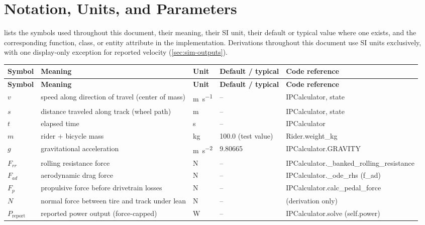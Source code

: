 \section{Notation, Units, and Parameters}
\label{sec:notation}

 lists the symbols used throughout this document, their
meaning, their SI unit, their default or typical value where one exists, and
the corresponding function, class, or entity attribute in the implementation.
Derivations
throughout this document use SI units exclusively, with one display-only
exception for reported velocity (\cref{sec:sim-outputs}).

{\scriptsize
\setlength{\tabcolsep}{4pt}
\begin{longtable}{@{}p{} p{} p{} p{} >{\ttfamily}p{}@{}}
    \toprule
    \textbf{Symbol} & \textbf{Meaning} & \textbf{Unit} & \textbf{Default / typical} & \textbf{Code reference} \\
    \midrule
    \endfirsthead
    \toprule
    \textbf{Symbol} & \textbf{Meaning} & \textbf{Unit} & \textbf{Default / typical} & \textbf{Code reference} \\
    \midrule
    \endhead
    $v$ & speed along direction of travel (center of mass) & \si{\metre\per\second} & -- & IPCalculator, state \\
    $s$ & distance traveled along track (wheel path) & \si{\metre} & -- & IPCalculator, state \\
    $t$ & elapsed time & \si{\second} & -- & IPCalculator \\
    $m$ & rider + bicycle mass & \si{\kilo\gram} & \num{100.0} (test value) & Rider.\allowbreak weight\_kg \\
    $g$ & gravitational acceleration & \si{\metre\per\second\squared} & \num{9.80665} & IPCalculator.\allowbreak GRAVITY \\
    $F_{rr}$ & rolling resistance force & \si{\newton} & -- & IPCalculator.\allowbreak \_banked\_rolling\_resistance \\
    $F_{ad}$ & aerodynamic drag force & \si{\newton} & -- & IPCalculator.\_ode\_rhs (f\_ad) \\
    $F_p$ & propulsive force before drivetrain losses & \si{\newton} & -- & IPCalculator.\allowbreak calc\_pedal\_force \\
    $N$ & normal force between tire and track under lean & \si{\newton} & -- & (derivation only) \\
    $P_{\mathrm{report}}$ & reported power output (force-capped) & \si{\watt} & -- & IPCalculator.solve (self.power) \\

\end{longtable}}
